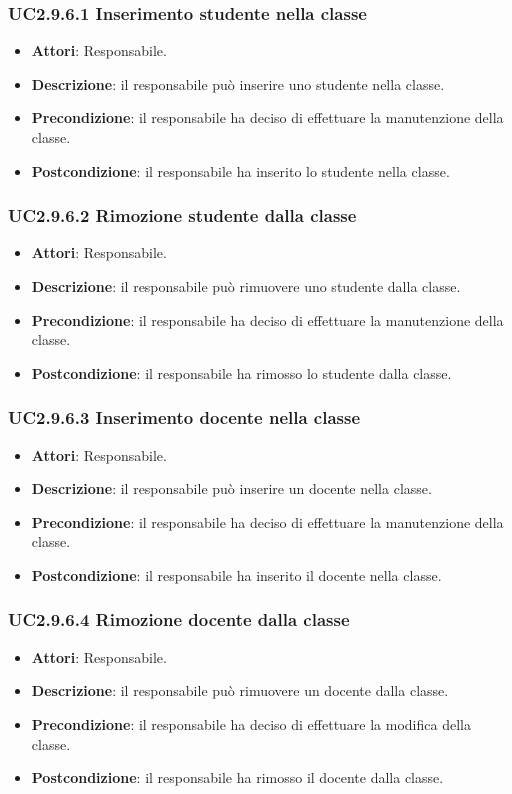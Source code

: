 \subsubsection{UC2.9.6.1 Inserimento studente nella classe}
\begin{itemize}
\item \textbf{Attori}: Responsabile.
\item \textbf{Descrizione}: il responsabile può inserire uno studente nella classe.
\item \textbf{Precondizione}: il responsabile ha deciso di effettuare la manutenzione della classe.
\item \textbf{Postcondizione}: il responsabile ha inserito lo studente nella classe.
\end{itemize}
\subsubsection{UC2.9.6.2 Rimozione studente dalla classe}
\begin{itemize}
\item \textbf{Attori}: Responsabile.
\item \textbf{Descrizione}: il responsabile può rimuovere uno studente dalla classe.
\item \textbf{Precondizione}: il responsabile ha deciso di effettuare la manutenzione della classe.
\item \textbf{Postcondizione}: il responsabile ha rimosso lo studente dalla classe.
\end{itemize}
\subsubsection{UC2.9.6.3 Inserimento docente nella classe}
\begin{itemize}
\item \textbf{Attori}: Responsabile.
\item \textbf{Descrizione}: il responsabile può inserire un docente nella classe.
\item \textbf{Precondizione}: il responsabile ha deciso di effettuare la manutenzione della classe.
\item \textbf{Postcondizione}: il responsabile ha inserito il docente nella classe.
\end{itemize}
\subsubsection{UC2.9.6.4 Rimozione docente dalla classe}
\begin{itemize}
\item \textbf{Attori}: Responsabile.
\item \textbf{Descrizione}: il responsabile può rimuovere un docente dalla classe.
\item \textbf{Precondizione}: il responsabile ha deciso di effettuare la modifica della classe.
\item \textbf{Postcondizione}: il responsabile ha rimosso il docente dalla classe.
\end{itemize}
